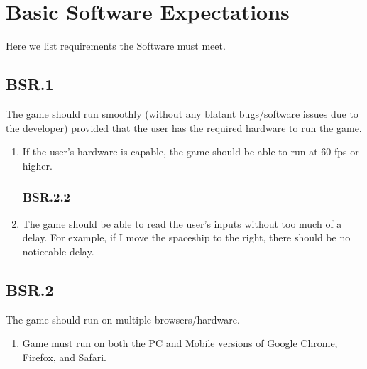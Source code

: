 \documentclass[12pt, letterpaper]{article}
\begin{document}
   \section{Basic Software Expectations}
   
   Here we list requirements the Software must meet. 
   
   \subsection*{BSR.1}
   
    The game should run smoothly (without any blatant bugs/software issues due to the developer) provided that the user has the required hardware to run the game.
    \begin{enumerate}[label=]
        \subsubsection*{BSR.1.1}
        \item If the user's hardware is capable, the game should be able to run at 60 fps or higher.
        \subsubsection*{BSR.2.2}
        \item The game should be able to read the user's inputs without too much of a delay. For example, if I move the spaceship to the right, there should be no noticeable delay. 
    \end{enumerate}
    
    \subsection*{BSR.2}
    
    The game should run on multiple browsers/hardware.
    \begin{enumerate}[label=]
        \subsubsection*{BSR.2.1}
        \item Game must run on both the PC and Mobile versions of Google Chrome, Firefox, and Safari.
    \end{enumerate}
    
\end{document}
